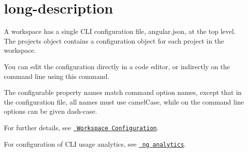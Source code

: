 \chapter{long-\/description}
\hypertarget{md__d_1_2_g_i_t_2_food_link_2foodlink_8client_2node__modules_2_0dangular_2cli_2src_2commands_2config_2long-description}{}\label{md__d_1_2_g_i_t_2_food_link_2foodlink_8client_2node__modules_2_0dangular_2cli_2src_2commands_2config_2long-description}
A workspace has a single CLI configuration file, {\ttfamily angular.\+json}, at the top level. The {\ttfamily projects} object contains a configuration object for each project in the workspace.

You can edit the configuration directly in a code editor, or indirectly on the command line using this command.

The configurable property names match command option names, except that in the configuration file, all names must use camel\+Case, while on the command line options can be given dash-\/case.

For further details, see \href{guide/workspace-config}{\texttt{ Workspace Configuration}}.

For configuration of CLI usage analytics, see \href{cli/analytics}{\texttt{ ng analytics}}. 